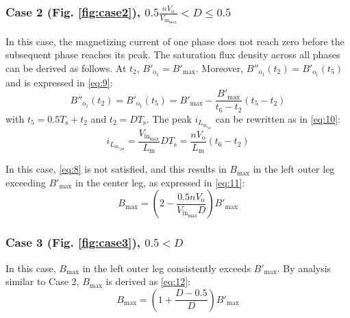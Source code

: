 \documentclass[lettersize,journal]{IEEEtran}
\begin{document}
\subsubsection*{\textup{Case 2 (Fig. \ref{fig:case2}), $0.5 \frac{n V_{\mathrm{o}}}{V_{\mathrm{in}_{\mathrm{max}}}} < D \le 0.5$}}
In this case, the magnetizing current of one phase does not reach zero before the subsequent phase reaches its peak. The saturation flux density across all phases can be derived as follows. At $t_2$, $B'_{\mathrm{o}_1} = B'_{\mathrm{max}}$. Moreover, $B''_{\mathrm{o}_1}(t_2) = B'_{\mathrm{o}_1}(t_5)$ and is expressed in \eqref{eq:9}:
\begin{equation}
\label{eq:9}
B''_{\mathrm{o}_1}(t_2) = B'_{\mathrm{o}_1}(t_5) = B'_{\mathrm{max}} - \frac{B'_{\mathrm{max}}}{t_6 - t_2}(t_5 - t_2)
\end{equation}
with $t_5 = 0.5 T_{\mathrm{s}} + t_2$ and $t_2 = D T_{\mathrm{s}}$. The peak $i_{L_{\mathrm{m}_{1_{\mathrm{pk}}}}}$ can be rewritten as in \eqref{eq:10}:
\begin{equation}
\label{eq:10}
i_{L_{{{\mathrm{m}_1}_{\mathrm{pk}}}}} = \frac{V_{\mathrm{in}_{\mathrm{max}}}}{L_{\mathrm{m}}} D T_{\mathrm{s}} = \frac{n V_{\mathrm{o}}}{L_{\mathrm{m}}}(t_6 - t_2)
\end{equation}

In this case, \eqref{eq:8} is not satisfied, and this results in $B_{\mathrm{max}}$ in the left outer leg exceeding $B'_{\mathrm{max}}$ in the center leg, as expressed in \eqref{eq:11}:
\begin{equation}
\label{eq:11}
B_{\mathrm{max}} = \left(2 - \frac{0.5 n V_{\mathrm{o}}}{V_{\mathrm{in}_{\mathrm{max}}} D}\right) B'_{\mathrm{max}}
\end{equation}

\subsubsection*{\textup{Case 3 (Fig. \ref{fig:case3}), $0.5 < D$}}
In this case, $B_{\mathrm{max}}$ in the left outer leg consistently exceeds $B'_{\mathrm{max}}$. By analysis similar to Case 2, $B_{\mathrm{max}}$ is derived as \eqref{eq:12}:
\begin{equation}
\label{eq:12}
B_{\mathrm{max}} = \left(1 + \frac{D - 0.5}{D}\right) B'_{\mathrm{max}}
\end{equation}
\end{document}
